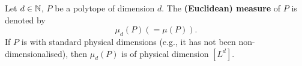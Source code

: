 \begin{notation}
  Let $d \in \mathbb{N}$,
  $P$ be a polytope of dimension $d$.
  The \textbf{(Euclidean) measure} of $P$ is denoted by
  \begin{equation}
    \mu_d(P) (= \mu(P)).
  \end{equation}
  If $P$ is with standard physical dimensions
  (e.g., it has not been non-dimensionalised),
  then $\mu_d(P)$ is of physical dimension $[L^d]$.
\end{notation}
